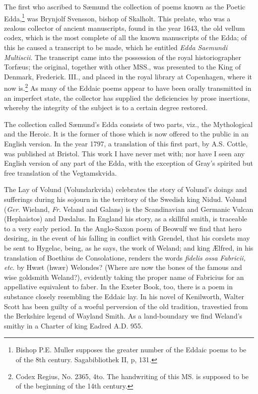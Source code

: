 The first who ascribed to Sæmund the collection of poems known as the
Poetic Edda,\footnote{Bishop P.E. Muller supposes the greater number of the
Eddaic poems to be of the 8th century. Sagabibliothek II, p, 131.} was Brynjolf Svensson, bishop of Skalholt. This
prelate, who was a zealous collector of ancient manuscripts, found in
the year 1643, the old vellum codex, which is the most complete of
all the known manuscripts of the Edda; of this he caused a transcript
to be made, which he entitled \emph{Edda Saemundi Multiscii}. The
transcript came into the possession of the royal historiographer
Torfæus; the original, together with other MSS., was presented to the
King of Denmark, Frederick. III., and placed in the royal library at
Copenhagen, where it now is.\footnote{Codex Regius, No. 2365, 4to. The handwriting of this MS.
is supposed to be of the beginning of the 14th century.} As many of the Eddaic poems appear to
have been orally transmitted in an imperfect state, the collector has
supplied the deficiencies by prose insertions, whereby the integrity
of the subject is to a certain degree restored.

The collection called Sæmund's Edda consists of two parts, viz., the
Mythological and the Heroic. It is the former of those which is now
offered to the public in an English version. In the year 1797, a
translation of this first part, by A.S. Cottle, was published at
Bristol. This work I have never met with; nor have I seen any English
version of any part of the Edda, with the exception of Gray's spirited
but free translation of the Vegtamskvida.

The Lay of Volund (Volundarkvida) celebrates the story of Volund's
doings and sufferings during his sojourn in the territory of the
Swedish king Nidud. Volund (\emph{Ger}. Wieland, \emph{Fr}. Veland and Galans)
is the Scandinavian and Germanic Vulcan (Hephaistos) and Dædalus. In
England his story, as a skillful smith, is traceable to a very early
period. In the Anglo-Saxon poem of Beowulf we find that hero desiring,
in the event of his falling in conflict with Grendel, that his
corslets may be sent to Hygelac, being, as he says, the work of
Weland; and king Ælfred, in his translation of Boethius de
Consolatione, renders the words \emph{fidelis ossa Fabricii, etc}. by Hwæt
(hwær) Welondes? (Where are now the bones of the famous and wise
goldsmith Weland?), evidently taking the proper name of Fabricius for
an appellative equivalent to faber. In the Exeter Book, too, there is
a poem in substance closely resembling the Eddaic lay. In his novel of
Kenilworth, Walter Scott has been guilty of a woeful perversion of the
old tradition, travestied from the Berkshire legend of Wayland Smith.
As a land-boundary we find Weland's smithy in a Charter of king Eadred
A.D. 955.

